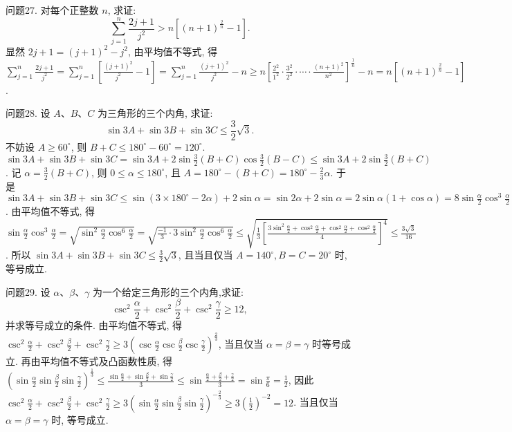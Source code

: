 问题27. 对每个正整数 $n$, 求证:
$$
\sum_{j=1}^n \frac{2 j+1}{j^2}>n\left[(n+1)^{\frac{2}{n}}-1\right] .
$$
显然 $2 j+1=(j+1)^2-j^2$, 由平均值不等式, 得 $\sum_{j=1}^n \frac{2 j+1}{j^2}= \sum_{j=1}^n\left[\frac{(j+1)^2}{j^2}-1\right]=\sum_{j=1}^n \frac{(j+1)^2}{j^2}-n \geqslant n\left[\frac{2^2}{1^2} \cdot \frac{3^2}{2^2} \cdot \cdots \cdot \frac{(n+1)^2}{n^2}\right]^{\frac{1}{n}}-n= n\left[(n+1)^{\frac{2}{n}}-1\right]$.



问题28. 设 $A 、 B 、 C$ 为三角形的三个内角, 求证:
$$
\sin 3 A+\sin 3 B+\sin 3 C \leqslant \frac{3}{2} \sqrt{3} .
$$
不妨设 $A \geqslant 60^{\circ}$, 则 $B+C \leqslant 180^{\circ}-60^{\circ}=120^{\circ}$. $\sin 3 A+\sin 3 B+ \sin 3 C=\sin 3 A+2 \sin \frac{3}{2}(B+C) \cos \frac{3}{2}(B-C) \leqslant \sin 3 A+2 \sin \frac{3}{2}(B+C)$. 记 $\alpha= \frac{3}{2}(B+C)$, 则 $0 \leqslant \alpha \leqslant 180^{\circ}$, 且 $A=180^{\circ}-(B+C)=180^{\circ}-\frac{2}{3} \alpha$. 于是 $\sin 3 A+ \sin 3 B+\sin 3 C \leqslant \sin \left(3 \times 180^{\circ}-2 \alpha\right)+2 \sin \alpha=\sin 2 \alpha+2 \sin \alpha=2 \sin \alpha(1+ \cos \alpha)=8 \sin \frac{\alpha}{2} \cos ^3 \frac{\alpha}{2}$. 由平均值不等式, 得 $\sin \frac{\alpha}{2} \cos ^3 \frac{\alpha}{2}=\sqrt{\sin ^2 \frac{\alpha}{2} \cos ^6 \frac{\alpha}{2}}= \sqrt{\frac{-1}{3} \cdot 3 \sin ^2 \frac{\alpha}{2} \cos ^6 \frac{\alpha}{2}} \leqslant \sqrt{\frac{1}{3}\left[\frac{3 \sin ^2 \frac{\alpha}{2}+\cos ^2 \frac{\alpha}{2}+\cos ^2 \frac{\alpha}{2}+\cos ^2 \frac{\alpha}{2}}{4}\right]^4} \leqslant \frac{3 \sqrt{3}}{16}$. 所以 $\sin 3 A+\sin 3 B+\sin 3 C \leqslant \frac{3}{2} \sqrt{3}$, 且当且仅当 $A=140^{\circ}, B=C=20^{\circ}$ 时, 等号成立.



问题29. 设 $\alpha 、 \beta 、 \gamma$ 为一个给定三角形的三个内角,求证:
$$
\csc ^2 \frac{\alpha}{2}+\csc ^2 \frac{\beta}{2}+\csc ^2 \frac{\gamma}{2} \geqslant 12,
$$
并求等号成立的条件.
由平均值不等式, 得 $\csc ^2 \frac{\alpha}{2}+\csc ^2 \frac{\beta}{2}+\csc ^2 \frac{\gamma}{2} \geqslant 3\left(\csc \frac{\alpha}{2} \csc \frac{\beta}{2} \csc \frac{\gamma}{2}\right)^{\frac{2}{3}}$, 当且仅当 $\alpha=\beta=\gamma$ 时等号成立.
再由平均值不等式及凸函数性质, 得 $\left(\sin \frac{\alpha}{2} \sin \frac{\beta}{2} \sin \frac{\gamma}{2}\right)^{\frac{1}{3}} \leqslant \frac{\sin \frac{\alpha}{2}+\sin \frac{\beta}{2}+\sin \frac{\gamma}{2}}{3} \leqslant \sin \frac{\frac{\alpha}{2}+\frac{\beta}{2}+\frac{\gamma}{2}}{3}=\sin \frac{\pi}{6}=\frac{1}{2}$, 因此 $\csc ^2 \frac{\alpha}{2}+\csc ^2 \frac{\beta}{2}+\csc ^2 \frac{\gamma}{2} \geqslant 3\left(\sin \frac{\alpha}{2} \sin \frac{\beta}{2} \sin \frac{\gamma}{2}\right)^{-\frac{2}{3}} \geqslant 3\left(\frac{1}{2}\right)^{-2}=12$. 当且仅当 $\alpha=\beta=\gamma$ 时, 等号成立.



